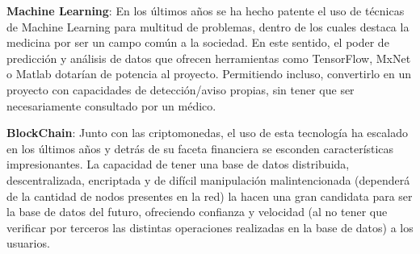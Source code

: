 \textbf{Machine Learning}: En los últimos años se ha hecho patente el uso de técnicas de Machine Learning para multitud de problemas, dentro de los cuales destaca la medicina por ser un campo común a la sociedad. En este sentido, el poder de predicción y análisis de datos que ofrecen herramientas como TensorFlow\cite{tensor}, MxNet\cite{mxnet} o Matlab dotarían de potencia al proyecto. Permitiendo incluso, convertirlo en un proyecto con capacidades de detección/aviso propias, sin tener que ser necesariamente consultado por un médico. 

\textbf{BlockChain}: Junto con las criptomonedas, el uso de esta tecnología ha escalado en los últimos años y detrás de su faceta financiera se esconden características impresionantes. La capacidad de tener una base de datos distribuida, descentralizada, encriptada y de difícil manipulación malintencionada (dependerá de la cantidad de nodos presentes en la red) la hacen una gran candidata para ser la base de datos del futuro, ofreciendo confianza y velocidad (al no tener que verificar por terceros las distintas operaciones realizadas en la base de datos) a los usuarios.

